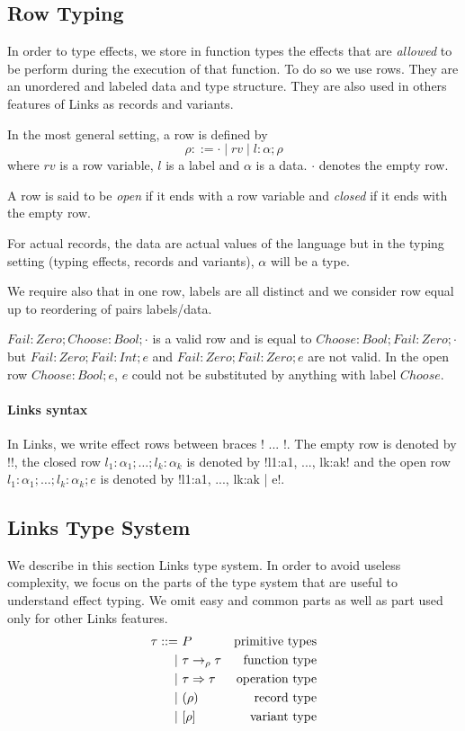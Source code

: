 \documentclass[11pt, nonacm=true, language=french, language=english]{acmart}
\begin{document}
\subsection{Row Typing}
\label{sec:row-typ}

In order to type effects, we store in function types the effects that are \emph{allowed} to be perform during the execution of that function. To do so we use rows. They are an unordered and labeled data and type structure. They are also used in others features of Links as records and variants.

In the most general setting, a row is defined by
\[
  \rho ::= \cdot \mid rv \mid l:\alpha;\rho
\]
where $rv$ is a row variable, $l$ is a label and $\alpha$ is a data. $\cdot$ denotes the empty row.

A row is said to be \emph{open} if it ends with a row variable and \emph{closed} if it ends with the empty row.

For actual records, the data are actual values of the language but in the typing setting (typing effects, records and variants), $\alpha$ will be a type.

We require also that in one row, labels are all distinct and we consider row equal up to reordering of pairs labels/data.

\begin{ex}
  $Fail:Zero; Choose:Bool; \cdot$ is a valid row and is equal to $Choose:Bool; Fail:Zero; \cdot$ but $Fail:Zero; Fail:Int; e$ and $Fail:Zero; Fail:Zero; e$ are not valid. In the open row $Choose:Bool; e$, $e$ could not be substituted by anything with label $Choose$.
\end{ex}

\paragraph{Links syntax}
In Links, we write effect rows between braces !{ ... }!. The empty row is denoted by !{}!, the closed row $l_{1}:\alpha_{1}; \dots; l_{k}:\alpha_{k}$ is denoted by !{l1:a1, ..., lk:ak}! and the open row $l_{1}:\alpha_{1}; \dots; l_{k}:\alpha_{k}; e$ is denoted by !{l1:a1, ..., lk:ak | e}!.


\subsection{Links Type System}
\label{sec:links-typ}

We describe in this section Links type system. In order to avoid useless complexity, we focus on the parts of the type system that are useful to understand effect typing. We omit easy and common parts as well as part used only for other Links features.
\begin{align*}
  \tau ::=\ & P & \text{primitive types} \\
  \mid\ & \tau \to_{\rho} \tau & \text{function type} \\
  \mid\ & \tau \Rightarrow \tau & \text{operation type} \\
  \mid\ & (\rho) & \text{record type} \\
  \mid\ & [\rho] & \text{variant type}
\end{align*}
\end{document}
